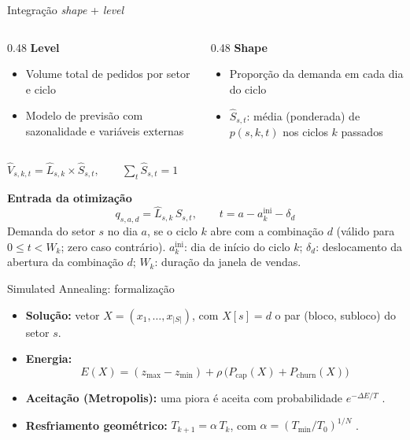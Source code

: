\documentclass[aspectratio=169,11pt]{beamer}
\begin{document}
\begin{frame}{Integração \textit{shape} + \textit{level}}
\begin{columns}[T]
        \begin{column}{0.48\textwidth}
            \textbf{Level}
            \begin{itemize}
                \item Volume total de pedidos por setor e ciclo
                \item Modelo de previsão com sazonalidade e variáveis externas
            \end{itemize}
        \end{column}
        \begin{column}{0.48\textwidth}
            \textbf{Shape}
            \begin{itemize}
                \item Proporção da demanda em cada dia do ciclo
                \item {\footnotesize $\hat{S}_{s,t}$: média (ponderada) de $p(s,k,t)$ nos ciclos $k$ passados}
            \end{itemize}
        \end{column}
    \end{columns}

    \vspace{0.4cm}
    \begin{center}
        $\hat{V}_{s,k,t} = \hat{L}_{s,k} \times \hat{S}_{s,t}, \qquad \sum_{t} \hat{S}_{s,t} = 1$
    \end{center}

    \vspace{0.2cm}
    \textbf{Entrada da otimização}
    \begin{equation*}
        q_{s,a,d} = \hat{L}_{s,k}\,\hat{S}_{s,t}, \qquad t = a - a_k^{\text{ini}} - \delta_d
    \end{equation*}
    {\footnotesize Demanda do setor $s$ no dia $a$, se o ciclo $k$ abre com a combinação $d$ (válido para $0 \le t < W_k$; zero caso contrário). $a_k^{\text{ini}}$: dia de início do ciclo $k$; $\delta_d$: deslocamento da abertura da combinação $d$; $W_k$: duração da janela de vendas.}
\end{frame}

\begin{frame}{Simulated Annealing: formalização}
  \begin{itemize}
    \item \textbf{Solução:} vetor $X = (x_1,\dots,x_{|S|})$, com $X[s] = d$ o par (bloco, subloco) do setor $s$.
    \item \textbf{Energia:}
      \[
        E(X) = (z_{\max} - z_{\min}) + \rho\,\bigl(P_{\text{cap}}(X) + P_{\text{churn}}(X)\bigr)
      \]
    \item \textbf{Aceitação (Metropolis):} uma piora é aceita com probabilidade $e^{-\Delta E / T}$ \cite{metropolis1953equation}\cite{kirkpatrick1983optimization}.
    \item \textbf{Resfriamento geométrico:} $T_{k+1} = \alpha\, T_k$, com
      $\alpha = (T_{\min}/T_0)^{1/N}$ \cite{aarts1985statistical}.
  \end{itemize}
\end{frame}
\end{document}
